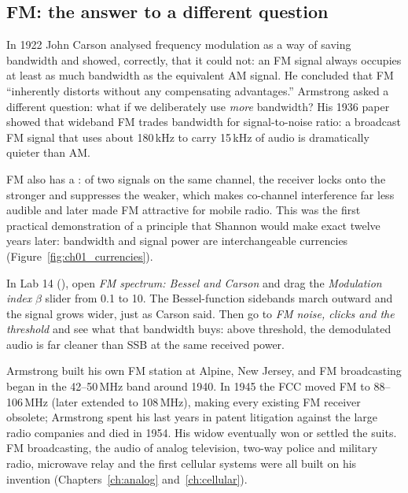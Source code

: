 \subsection{FM: the answer to a different question}
\label{sec:ch01:fm}

In 1922 John Carson analysed frequency modulation as a way of saving bandwidth and showed, correctly,
that it could not: an FM signal always occupies at least as much bandwidth as the equivalent AM signal.
He concluded that FM ``inherently distorts without any compensating advantages.'' Armstrong asked a
different question: what if we deliberately use \emph{more} bandwidth? His 1936 paper showed that
wideband FM trades bandwidth for signal-to-noise ratio: a broadcast FM signal that uses about 180\,kHz
to carry 15\,kHz of audio is dramatically quieter than AM.

FM also has a : of two signals on the same channel, the receiver locks onto the
stronger and suppresses the weaker, which makes co-channel interference far less audible and later made
FM attractive for mobile radio. This was the first practical demonstration of a principle that Shannon
would make exact twelve years later: bandwidth and signal power are interchangeable currencies
(Figure~\ref{fig:ch01_currencies}).


\begin{tryit}
In Lab 14 (), open \emph{FM spectrum: Bessel and Carson} and drag the
\emph{Modulation index} $\beta$ slider from 0.1 to 10. The Bessel-function sidebands march outward and the
signal grows wider, just as Carson said. Then go to \emph{FM noise, clicks and the threshold} and see what
that bandwidth buys: above threshold, the demodulated audio is far cleaner than SSB at the same received
power.
\end{tryit}

Armstrong built his own FM station at Alpine, New Jersey, and FM broadcasting began in the 42--50\,MHz
band around 1940. In 1945 the FCC moved FM to 88--106\,MHz (later extended to 108\,MHz), making every
existing FM receiver obsolete; Armstrong spent his last years in patent litigation against the large
radio companies and died in 1954. His widow eventually won or settled the suits. FM broadcasting, the
audio of analog television, two-way police and military radio, microwave relay and the first cellular
systems were all built on his invention (Chapters~\ref{ch:analog} and~\ref{ch:cellular}).


